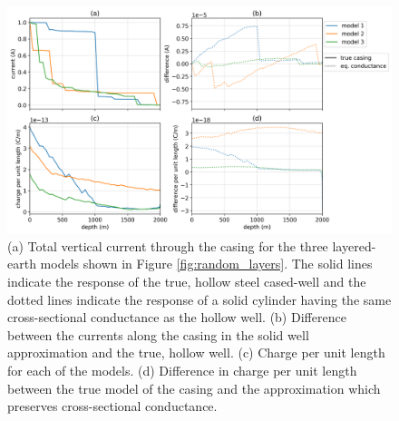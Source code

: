 \begin{figure}
    \begin{center}
    \includegraphics[width=\textwidth]{figures/approximating_wells_currents_charges_random.png}
    \end{center}
\caption{
    (a) Total vertical current through the casing for the three layered-earth models shown in
    Figure \ref{fig:random_layers}. The solid lines indicate the response of the true, hollow steel cased-well
    and the dotted lines indicate the response of a solid cylinder having the same cross-sectional conductance
    as the hollow well. (b) Difference between the currents along the casing in the solid well approximation
    and the true, hollow well.
    (c) Charge per unit length for each of the models. (d) Difference in charge per unit length between the
    true model of the casing and the approximation which preserves cross-sectional conductance.
}
\label{fig:approximating_wells_currents_charges_random}
\end{figure}
